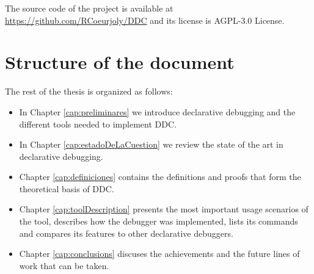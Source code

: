 The source code of the project is available at \url{https://github.com/RCoeurjoly/DDC} 
and its license is AGPL-3.0 License.

\section{Structure of the document}
The rest of the thesis is organized as follows:
\begin{itemize}
    \item In Chapter \ref{cap:preliminares} we introduce declarative debugging and the different tools needed to implement DDC.
    \item  In Chapter \ref{cap:estadoDeLaCuestion} we review the state of the art in declarative debugging. 
    \item Chapter \ref{cap:definiciones} contains the definitions and proofs that form the theoretical basis of DDC. 
    \item Chapter \ref{cap:toolDescription} presents the most important usage scenarios of the tool, describes how the debugger was implemented, lists its commands and compares its features to other declarative debuggers. 
    \item Chapter \ref{cap:conclusions} discuses the achievements and the future lines of work that can be taken.
\end{itemize}
